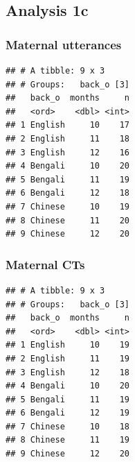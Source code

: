\documentclass[]{article}
\newenvironment{Shaded}{\begin{snugshade}}{\end{snugshade}}
\newcommand{\DataTypeTok}[1]{\textcolor[rgb]{0.13,0.29,0.53}{#1}}
\newcommand{\KeywordTok}[1]{\textcolor[rgb]{0.13,0.29,0.53}{\textbf{#1}}}
\newcommand{\NormalTok}[1]{#1}
\newcommand{\OperatorTok}[1]{\textcolor[rgb]{0.81,0.36,0.00}{\textbf{#1}}}
\newcommand{\StringTok}[1]{\textcolor[rgb]{0.31,0.60,0.02}{#1}}
\begin{document}
\hypertarget{analysis-1c}{%
\subsection{Analysis 1c}\label{analysis-1c}}

\hypertarget{maternal-utterances-2}{%
\subsubsection{Maternal utterances}\label{maternal-utterances-2}}

\begin{Shaded}
\end{Shaded}

\begin{verbatim}
## # A tibble: 9 x 3
## # Groups:   back_o [3]
##   back_o  months     n
##   <ord>    <dbl> <int>
## 1 English     10    17
## 2 English     11    18
## 3 English     12    16
## 4 Bengali     10    20
## 5 Bengali     11    19
## 6 Bengali     12    18
## 7 Chinese     10    19
## 8 Chinese     11    20
## 9 Chinese     12    20
\end{verbatim}

\hypertarget{maternal-cts}{%
\subsubsection{Maternal CTs}\label{maternal-cts}}

\begin{Shaded}
\end{Shaded}

\begin{verbatim}
## # A tibble: 9 x 3
## # Groups:   back_o [3]
##   back_o  months     n
##   <ord>    <dbl> <int>
## 1 English     10    19
## 2 English     11    19
## 3 English     12    18
## 4 Bengali     10    20
## 5 Bengali     11    19
## 6 Bengali     12    19
## 7 Chinese     10    18
## 8 Chinese     11    19
## 9 Chinese     12    20
\end{verbatim}
\end{document}
